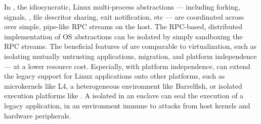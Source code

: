 In \graphene{},
the idiosyncratic, Linux multi-process abstractions
--- including forking, signals, \sysvipc{}, file descritor sharing, exit notification, etc
--- are coordinated across \picoprocs{}
over simple, pipe-like RPC streams on the host.
The RPC-based, distributed implementation of OS abstractions
can be isolated by simply sandboxing the RPC streams.
The beneficial features of \graphene{} are comparable to virtualization,
such as 
isolating mutually untrusting applications,
migration,
and platform independence
--- at a lower resource cost.
Especially, with platform independence, \graphene{}
can extend
the legacy support for Linux applications
onto other platforms,
such as microkernels like L4, a heterogeneous environment like Barrelfish,
or isolated execution platforms like .
A \graphene{} \picoproc{} isolated in an enclave
can seal the execution of a legacy application,
in an environment immune to attacks from host kernels
and hardware peripherals.




